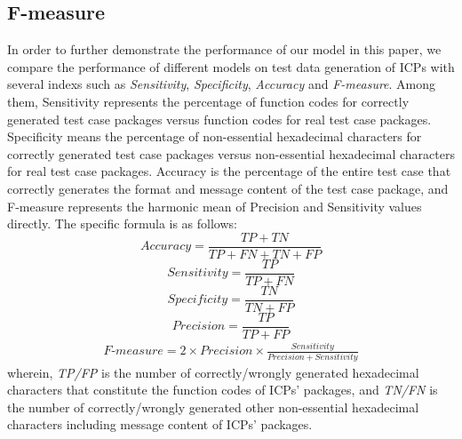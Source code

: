 \subsection{\textbf{F-measure}}
In order to further demonstrate the performance of our model in this paper, we compare the performance of different models on test data generation of ICPs with several indexs such as \textit{Sensitivity}, \textit{Specificity}, \textit{Accuracy} and \textit{F-measure}. Among them, Sensitivity represents the percentage of function codes for correctly generated test case packages versus function codes for real test case packages. Specificity means the percentage of non-essential hexadecimal characters for correctly generated test case packages versus non-essential hexadecimal characters for real test case packages. Accuracy is the percentage of the entire test case that correctly generates the format and message content of the test case package, and F-measure represents the harmonic mean of Precision and Sensitivity values directly. The specific formula is as follows:
\begin{equation}
Accuracy = \frac{{TP + TN}}{{TP + FN + TN + FP}}
\end{equation}
\begin{equation}
Sensitivity = \frac{{TP}}{{TP + FN}}
\end{equation}
\begin{equation}
Specificity = \frac{{TN}}{{TN + FP}}
\end{equation}
\begin{equation}
Precision = \frac{{TP}}{{TP + FP}}
\end{equation}
\begin{equation}
\begin{array}{l}
\textit{F-measure}=\displaystyle{2 \times Precision \times} \displaystyle\frac{{Sensitivity}}{{Precision + Sensitivity}}
\end{array}
\end{equation}
wherein, \textit{TP/FP} is the number of correctly/wrongly generated hexadecimal characters that constitute the function codes of ICPs' packages, and \textit{TN/FN} is the number of correctly/wrongly generated other non-essential hexadecimal characters including message content of ICPs' packages.


